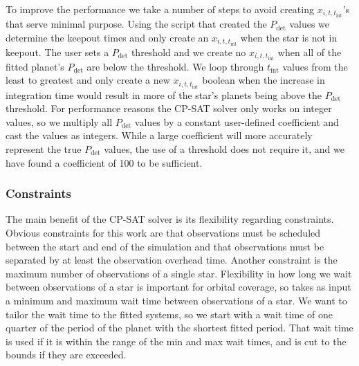 To improve the performance we take a number of steps to avoid creating $x_{i,
t, t_{\textrm{int}}}$'s that serve minimal purpose. Using the  script
that created the $P_{\textrm{det}}$ values we determine the keepout times and
only create an $x_{i, t, t_{\textrm{int}}}$ when the star is not in keepout.
The user sets a $P_{\textrm{det}}$ threshold and we create no $x_{i, t,
t_{\textrm{int}}}$ when all of the fitted planet's $P_{\textrm{det}}$ are below
the threshold. We loop through $t_{\textrm{int}}$ values from the least
to greatest and only create a new $x_{i, t, t_{\textrm{int}}}$ boolean when the
increase in integration time would result in more of the star's planets being above
the $P_{\textrm{det}}$ threshold. For performance reasons the CP-SAT solver
only works on integer values, so we multiply all $P_{\textrm{det}}$ values by a
constant user-defined coefficient and cast the values as integers. While a
large coefficient will more accurately represent the true $P_{\textrm{det}}$
values, the use of a threshold does not require it, and we have found a
coefficient of 100 to be sufficient.

\subsubsection{Constraints}

The main benefit of the CP-SAT solver is its flexibility regarding constraints.
Obvious constraints for this work are that observations must be scheduled
between the start and end of the simulation and that observations must be
separated by at least the observation overhead time. Another constraint is the
maximum number of observations of a single star. Flexibility in how long we
wait between observations of a star is important for orbital coverage, so
 takes as input a minimum and maximum wait time between observations
of a star. We want to tailor the wait time to the fitted systems, so we start
with a wait time of one quarter of the period of the planet with the shortest
fitted period. That wait time is used if it is within the range of the min and
max wait times, and is cut to the bounds if they are exceeded.

